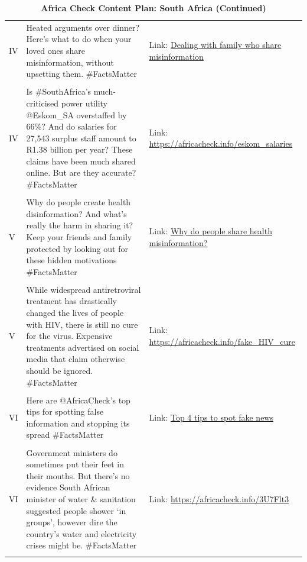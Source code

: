  
	\begin{table}[ht]
		\centering
     \caption{\textbf{Africa Check Content Plan: South Africa (Continued)} \label{tab:SA_2}}
		\begin{tabular}{|p{1cm}|p{7cm}|p{5cm}|}
			\hline
   IV & Heated arguments over dinner? Here’s what to do when your loved ones share misinformation, without upsetting them. \#FactsMatter & Link: \href{https://www.dropbox.com/s/s702vzeb8sc39ij/Africa_Check_misinformation.mp4?dl=0}{Dealing with family who share misinformation} \\ &  &\\
        IV & Is \#SouthAfrica’s much-criticised power utility @Eskom\_SA overstaffed by 66\%? And do salaries for 27,543 surplus staff amount to R1.38 billion per year? 
        These claims have been much shared online. But are they accurate? 
        \#FactsMatter
 & Link: \url{https://africacheck.info/eskom_salaries} \\ &  &\\
 V & Why do people create health disinformation? And what’s really the harm in sharing it? Keep your friends and family protected by looking out for these hidden motivations \#FactsMatter & Link: \href{https://www.dropbox.com/s/v8voe5fqa4b1fr2/Africa_Check_covid.mp4?dl=0}{Why do people share health misinformation?} \\ &  &\\
 V & While widespread antiretroviral treatment has drastically changed the lives of people with HIV, there is still no cure for the virus. Expensive treatments advertised on social media that claim otherwise should be ignored. \#FactsMatter
 & Link: \url{https://africacheck.info/fake_HIV_cure} \\ &  &\\
 VI & Here are @AfricaCheck’s top tips for spotting false information and stopping its spread
 \#FactsMatter & Link: \href{https://www.dropbox.com/s/wl2mzgkvqnw47dl/Africa_Check_youtube_fakenews.mp4?dl=0}{Top 4 tips to spot fake news} \\ &  &\\
 VI & Government ministers do sometimes put their feet in their mouths. But there’s no evidence South African minister of water \& sanitation suggested people shower ‘in groups’, however dire the country’s water and electricity crises might be.
 \#FactsMatter
 & Link: \url{https://africacheck.info/3U7Flt3} \\ &  &\\
\hline
		\end{tabular}
  \end{table}

